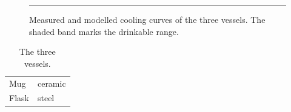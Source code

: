 \documentclass[a4paper, 11pt]{article}
\begin{document}
\listoffigures
\listoftables

\begin{figure}[htbp]
    \centering
    \rule{4cm}{2cm} %
    \caption[Cooling curves]{Measured and modelled cooling curves of the
        three vessels. The shaded band marks the drinkable range.}
\end{figure}

\begin{table}[htbp]
    \centering
    \caption{The three vessels.}
    \begin{tabular}{ll}
        Mug & ceramic \\
        Flask & steel \\
    \end{tabular}
\end{table}
\end{document}
